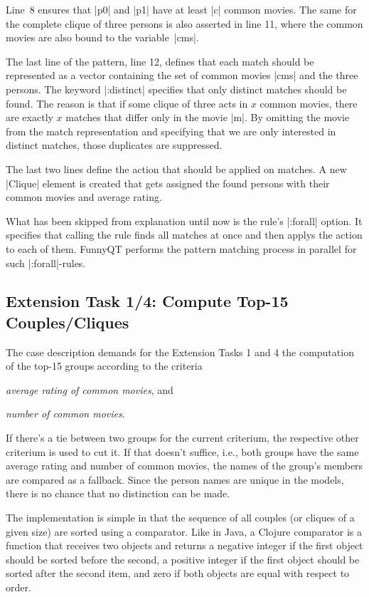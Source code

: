 \documentclass[submission]{eptcs}
\newcommand{\code}{\clojureinline}
\begin{document}
Line~8 ensures that \code|p0| and \code|p1| have at least \code|c| common
movies.  The same for the complete clique of three persons is also asserted in
line 11, where the common movies are also bound to the variable~\code|cms|.

The last line of the pattern, line 12, defines that each match should be
represented as a vector containing the set of common movies \code|cms| and the
three persons.  The keyword \code|:distinct| specifies that only distinct
matches should be found.  The reason is that if some clique of three acts in
\(x\)
common movies, there are exactly \(x\)
matches that differ only in the movie \code|m|.  By omitting the movie from the
match representation and specifying that we are only interested in distinct
matches, those duplicates are suppressed.

The last two lines define the action that should be applied on matches.  A new
\code|Clique| element is created that gets assigned the found persons with
their common movies and average rating.

What has been skipped from explanation until now is the rule's \code|:forall|
option.  It specifies that calling the rule finds all matches at once and then
applys the action to each of them.  FunnyQT performs the pattern matching
process in parallel for such \code|:forall|-rules.


\subsection{Extension Task 1/4: Compute Top-15 Couples/Cliques}
\label{sec:ext-task-1:top-15}

The case description demands for the Extension Tasks 1 and 4 the computation of
the top-15 groups according to the criteria
\begin{inparaenum}[(a)]
\item \emph{average rating of common movies}, and
\item \emph{number of common movies}.
\end{inparaenum}
If there's a tie between two groups for the current criterium, the respective
other criterium is used to cut it.  If that doesn't suffice, i.e., both groups
have the same average rating and number of common movies, the names of the
group's members are compared as a fallback.  Since the person names are unique
in the models, there is no chance that no distinction can be made.

The implementation is simple in that the sequence of all couples (or cliques of
a given size) are sorted using a comparator.  Like in Java, a Clojure
comparator is a function that receives two objects and returns a negative
integer if the first object should be sorted before the second, a positive
integer if the first object should be sorted after the second item, and zero if
both objects are equal with respect to order.
\end{document}
